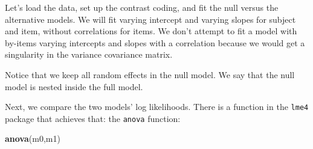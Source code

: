 \documentclass[12pt,]{krantz}
\newenvironment{Shaded}{\begin{snugshade}}{\end{snugshade}}
\newcommand{\DataTypeTok}[1]{\textcolor[rgb]{0.13,0.29,0.53}{#1}}
\newcommand{\DecValTok}[1]{\textcolor[rgb]{0.00,0.00,0.81}{#1}}
\newcommand{\KeywordTok}[1]{\textcolor[rgb]{0.13,0.29,0.53}{\textbf{#1}}}
\newcommand{\NormalTok}[1]{#1}
\newcommand{\OperatorTok}[1]{\textcolor[rgb]{0.81,0.36,0.00}{\textbf{#1}}}
\newcommand{\OtherTok}[1]{\textcolor[rgb]{0.56,0.35,0.01}{#1}}
\newcommand{\StringTok}[1]{\textcolor[rgb]{0.31,0.60,0.02}{#1}}
\begin{document}
Let's load the data, set up the contrast coding, and fit the null versus the alternative models. We will fit varying intercept and varying slopes for subject and item, without correlations for items. We don't attempt to fit a model with by-items varying intercepts and slopes with a correlation because we would get a singularity in the variance covariance matrix.

\begin{Shaded}
\end{Shaded}

Notice that we keep all random effects in the null model. We say that the null model is nested inside the full model.

Next, we compare the two models' log likelihoods. There is a function in the \texttt{lme4} package that achieves that: the \texttt{anova} function:

\begin{Shaded}
\begin{Highlighting}[]
\KeywordTok{anova}\NormalTok{(m0,m1)}
\end{Highlighting}
\end{Shaded}
\end{document}
